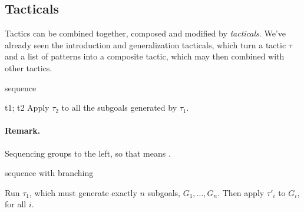 































\subsection{Tacticals}
\label{subsec:tacticals}

Tactics can be combined together, composed and modified by
\emph{tacticals}. We've already seen the introduction and generalization
tacticals, which turn a tactic $\tau$ and a list of patterns into
a composite tactic, which may then combined with other tactics.

\begin{tactic}{sequence}
  \begin{tsyntax}[empty]{t1; t2}
  Apply $\tau_2$ to all the subgoals generated by $\tau_1$.

  \paragraph{Remark.} Sequencing groups to the left, so that
     means
    .
  \end{tsyntax}
\end{tactic}

\begin{tactic}{sequence with branching}
  \begin{tsyntax}[empty]{}
    Run $\tau_1$, which must generate exactly $n$ subgoals, $G_1,\ldots,G_n$.
    Then apply $\tau'_i$ to $G_i$, for all $i$.
  \end{tsyntax}
\end{tactic}

